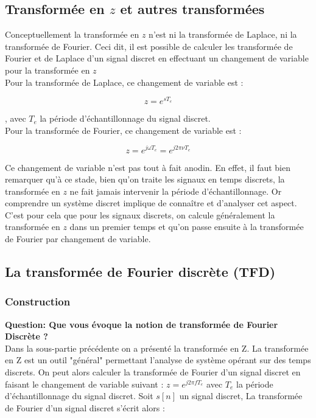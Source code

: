 \documentclass[11pt,a4paper]{article}
\begin{document}
\subsection{Transformée en $z$ et  autres transformées}
Conceptuellement la transformée en $z$ n'est ni la transformée de Laplace, ni la transformée de Fourier. Ceci dit, il est possible de calculer les transformée de Fourier et de Laplace d'un signal discret en effectuant un changement de variable pour la transformée en $z$\\

Pour la transformée de Laplace, ce changement  de variable est : 

\[z = e^{sT_e}\]

, avec $T_e$ la période d'échantillonnage du signal discret.\\

Pour la transformée de Fourier, ce changement de variable est :

\[z = e^{j\omega T_e} =  e^{j 2 \pi \nu T_e} \]

Ce changement de variable n'est pas tout à fait anodin. En effet, il faut bien remarquer qu'à ce stade, bien qu'on traite les signaux en temps discrets, la transformée en $z$ ne fait jamais intervenir la période d'échantillonnage. Or comprendre un système discret implique de connaître et d'analyser cet aspect. C'est pour cela que pour les signaux discrets, on calcule généralement la transformée en $z$ dans un premier temps et qu'on passe ensuite à la transformée de Fourier par changement de variable.\\


 
\subsection{La transformée de Fourier discrète (TFD)}
\subsubsection{Construction}
\textbf{Question: Que vous évoque la notion de transformée de Fourier Discrète ?}\\

Dans la sous-partie précédente on a présenté la transformée en Z. La transformée en Z est un outil "général" permettant l'analyse de système  opérant sur des temps discrets. On peut alors calculer la transformée de Fourier d'un signal discret en faisant le changement de variable suivant : $z = e^{j2\pi f T_e}$ avec $T_e$ la période d'échantillonnage du signal discret. Soit $s[n]$ un signal discret, La transformée de Fourier d'un signal discret s'écrit alors : 
\end{document}
